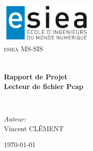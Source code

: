\begin{titlepage}
\begin{center}

\includegraphics[width=0.35\textwidth]{./ESIEA_2014_logo.png}~\\[1cm]

\textsc{\LARGE esiea MS-SIS}\\[1.5cm]

\textsc{\Large }\\[0.5cm]

\HRule \\[0.4cm]

{\huge \bfseries Rapport de Projet \\ Lecteur de fichier Pcap \\[0.4cm] }

\HRule \\[1.5cm]

\begin{minipage}{0.4\textwidth}
\begin{flushleft} \large
\emph{Auteur:}\\
Vincent \textsc{CLÉMENT}\\
\end{flushleft}
\end{minipage}
\vfill

{\large \today}

\end{center}
\end{titlepage}
